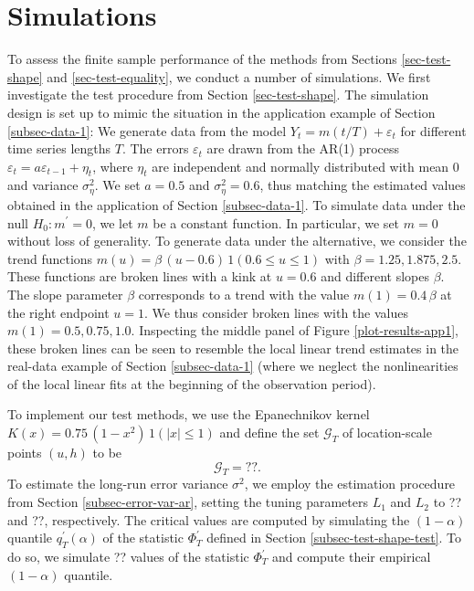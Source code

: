 
\section{Simulations}\label{sec-sim}


To assess the finite sample performance of the methods from Sections \ref{sec-test-shape} and \ref{sec-test-equality}, we conduct a number of simulations. We first investigate the test procedure from Section \ref{sec-test-shape}. The simulation design is set up to mimic the situation in the application example of Section \ref{subsec-data-1}: We generate data from the model $Y_t = m(t/T) + \varepsilon_t$ for different time series lengths $T$. The errors $\varepsilon_t$ are drawn from the AR(1) process $\varepsilon_t = a \varepsilon_{t-1} + \eta_t$, where $\eta_t$ are independent and normally distributed with mean $0$ and variance $\sigma_\eta^2$. We set $a = 0.5$ and $\sigma_\eta^2 = 0.6$, thus matching the estimated values obtained in the application of Section \ref{subsec-data-1}. To simulate data under the null $H_0: m^\prime = 0$, we let $m$ be a constant function. In particular, we set $m = 0$ without loss of generality. To generate data under the alternative, we consider the trend functions $m(u) = \beta \, (u - 0.6) \, 1(0.6 \le u \le 1)$ with $\beta = 1.25, 1.875, 2.5$. These functions are broken lines with a kink at $u = 0.6$ and different slopes $\beta$. The slope parameter $\beta$ corresponds to a trend with the value $m(1) = 0.4 \, \beta$ at the right endpoint $u = 1$. We thus consider broken lines with the values $m(1) = 0.5, 0.75, 1.0$. Inspecting the middle panel of Figure \ref{plot-results-app1}, these broken lines can be seen to resemble the local linear trend estimates in the real-data example of Section \ref{subsec-data-1} (where we neglect the nonlinearities of the local linear fits at the beginning of the observation period). 


To implement our test methods, we use the Epanechnikov kernel $K(x) = 0.75 \, (1 - x^2) \, 1(|x| \le 1)$ and define the set $\mathcal{G}_T$ of location-scale points $(u,h)$ to be 
\begin{equation}\label{grid-sim-app}
\mathcal{G}_T = ??. 
\end{equation}
To estimate the long-run error variance $\sigma^2$, we employ the estimation procedure from Section \ref{subsec-error-var-ar}, setting the tuning parameters $L_1$ and $L_2$ to ?? and ??, respectively. The critical values are computed by simulating the $(1-\alpha)$ quantile $q_T^\prime(\alpha)$ of the statistic $\Phi^\prime_T$ defined in Section \ref{subsec-test-shape-test}. To do so, we simulate ?? values of the statistic $\Phi^\prime_T$ and compute their empirical $(1-\alpha)$ quantile. 


